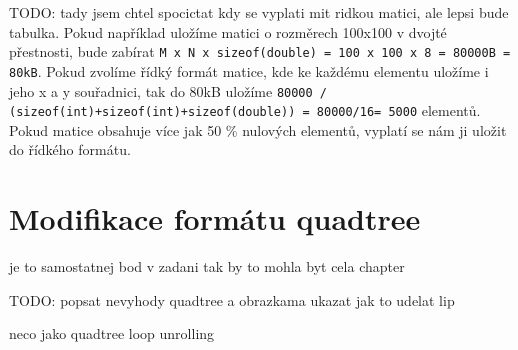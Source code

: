 TODO: tady jsem chtel spocictat kdy  se vyplati mit ridkou matici, ale lepsi bude tabulka. Pokud například uložíme matici o rozměrech 100x100 v dvojté přestnosti, bude zabírat \texttt{M x N x sizeof(double) = 100 x 100 x 8 = 80000B = 80kB}. Pokud zvolíme řídký formát matice, kde ke každému elementu uložíme i jeho x a y souřadnici, tak do 80kB uložíme \texttt{80000 / (sizeof(int)+sizeof(int)+sizeof(double)) = 80000/16= 5000} elementů. Pokud matice obsahuje více jak 50  \% nulových elementů, vyplatí se nám ji uložit do řídkého formátu.


\chapter{Modifikace formátu quadtree}

je to samostatnej bod v zadani tak by to mohla byt cela chapter

TODO: popsat nevyhody quadtree a obrazkama ukazat jak to udelat lip

neco jako quadtree loop unrolling
